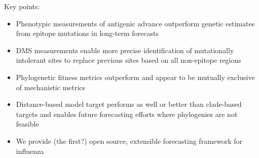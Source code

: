 Key points:

\begin{itemize}
\item{Phenotypic measurements of antigenic advance outperform genetic estimates from epitope mutations in long-term forecasts}
\item{DMS measurements enable more precise identification of mutationally intolerant sites to replace previous sites based on all non-epitope regions}
\item{Phylogenetic fitness metrics outperform and appear to be mutually exclusive of mechanistic metrics}
\item{Distance-based model target performs as well or better than clade-based targets and enables future forecasting efforts where phylogenies are not feasible}
\item{We provide (the first?) open source, extensible forecasting framework for influenza}
\end{itemize}

